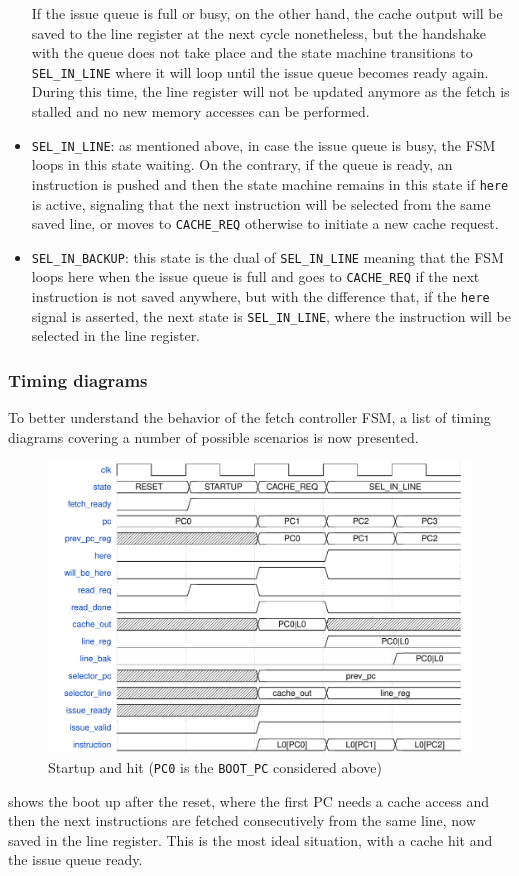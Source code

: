 \begin{itemize}
  If the issue queue is full or busy, on the other hand, the cache output will be saved to the line register at the next cycle nonetheless, but the handshake with the queue does not take place and the state machine transitions to \texttt{SEL\_IN\_LINE} where it will loop until the issue queue becomes ready again. During this time, the line register will not be updated anymore as the fetch is stalled and no new memory accesses can be performed. 
  \item \texttt{SEL\_IN\_LINE}: as mentioned above, in case the issue queue is busy, the \acs{FSM} loops in this state waiting. On the contrary, if the queue is ready, an instruction is pushed and then the state machine remains in this state if \texttt{here} is active, signaling that the next instruction will be selected from the same saved line, or moves to \texttt{CACHE\_REQ} otherwise to initiate a new cache request.
  \item \texttt{SEL\_IN\_BACKUP}: this state is the dual of \texttt{SEL\_IN\_LINE} meaning that the \acs{FSM} loops here when the issue queue is full and goes to \texttt{CACHE\_REQ} if the next instruction is not saved anywhere, but with the difference that, if the \texttt{here} signal is asserted, the next state is \texttt{SEL\_IN\_LINE}, where the instruction will be selected in the line register.
\end{itemize}

\subsubsection{Timing diagrams}
To better understand the behavior of the fetch controller \acs{FSM}, a list of timing diagrams covering a number of possible scenarios is now presented.

\begin{figure}[hbt]
  \centering
  \includegraphics[width=\textwidth]{img/fetch01.pdf}
  \caption[Startup and hit]{Startup and hit (\texttt{PC0} is the \texttt{BOOT\_PC} considered above)}
  \label{fig:fetch01}
\end{figure}
 shows the boot up after the reset, where the first \ac{PC} needs a cache access and then the next instructions are fetched consecutively from the same line, now saved in the line register. This is the most ideal situation, with a cache hit and the issue queue ready.

